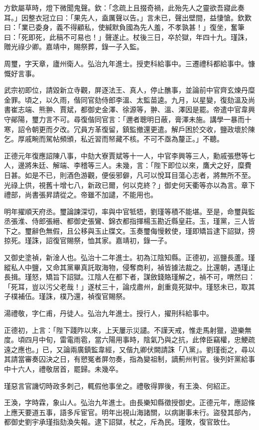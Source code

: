 \begin{pinyinscope}
方欽屬草時，燈下微聞鬼聲。欽：「念疏上且掇奇禍，此殆先人之靈欲吾寢此奏耳。」因整衣冠立曰：「果先人，盍厲聲以告。」言未已，聲出壁間，益悽愴。欽歎曰：「業已委身，義不得顧私，使緘默負國為先人羞，不孝孰甚！」復坐，奮筆曰：「死即死，此稿不可易也！」聲遂止。杖後三日，卒於獄，年四十九。瑾誅，贈光祿少卿。嘉靖中，賜祭葬，錄一子入監。

周璽，字天章，廬州衛人。弘治九年進士。授吏科給事中。三遷禮科都給事中。慷慨好言事。

武宗初即位，請毀新立寺觀，屏逐法王、真人，停止醮事，並論前中官齊玄煉丹糜金罪。頃之，以久雨，偕同官劾侍郎李溫、太監苗逵。九月，以星變，復劾溫及尚書崔志端、熊翀、賈斌，都御史金澤、徐源等，翀、溫、澤因是罷。帝遣中官韋興守鄖陽，璽力言不可。尋復偕同官言：「邇者聰明日蔽，膏澤未施。講學一暴而十寒，詔令朝更而夕改。冗員方革復留，鎮監撤還更遣。解戶困於交收，鹽政壞於陳乞。厚戚畹而駕帖頻頒，私近習而帑藏不核。不可不亟為釐正。」不聽。

正德元年復應詔陳八事，中劾大寮賈斌等十一人，中官李興等三人，勳戚張懋等七人，邊將朱廷、解端、李稽等三人。未幾，言：「陛下即位以來，鷹犬之好，糜費日甚。如是不已，則酒色游觀，便佞邪僻，凡可以悅耳目蕩心志者，將無所不至。光祿上供，視舊十增七八，新政已爾，何以克終？」御史何天衢等亦以為言。章下禮部，尚書張昇請從之。帝雖不加譴，不能用也。

明年擢順天府丞。璽論諫深切，率與中官牴牾，劉瑾等積不能堪。至是，命璽與監丞張淮、侍郎張縉、都御史張鸞、錦衣都指揮楊玉勘近縣皇莊。玉，瑾黨，三人皆下之。璽辭色無假，且公移與玉止牒文。玉奏璽侮慢敕使，瑾即矯旨逮下詔獄，搒掠死。瑾誅，詔復官賜祭，恤其家。嘉靖初，錄一子。

又御史塗禎，新淦人也。弘治十二年進士。初為江陰知縣。正德初，巡鹽長蘆。瑾縱私人中鹽，又命其黨畢真託取海物，侵奪商利，禎皆據法裁之。比還朝，遇瑾止長揖。瑾怒，矯旨下詔獄。江陰人在都下者，謀斂錢賂瑾解之，禎不可，喟然曰：「死耳，豈以污父老哉！」遂杖三十，論戍肅州，創重竟死獄中。瑾怒未已，取其子樸補伍。瑾誅，樸乃還，禎復官賜祭。

湯禮敬，字仁甫，丹徒人。弘治九年進士。授行人，擢刑科給事中。

正德初，上言：「陛下踐阼以來，上天屢示災譴。不謹天戒，惟走馬射獵，遊樂無度。頃四月中旬，雷電雨雹，當六陽用事時，陰氣乃與之抗，此倖臣竊權，忠鯁疏遠之應也。」已，又論兩廣鎮監韋經，又偕九卿伏闕請誅「八黨」。劉瑾銜之，尋以其請當審奏囚決之日，有愬冤者屏勿奏，指為變祖制，謫薊州判官。後列奸黨給事中十六人，禮敬居首，罷歸。未幾卒。

瑾惡言官譏切時政多刺己，輒假他事坐之。禮敬得罪後，有王渙、何紹正。

王渙，字時霖，象山人。弘治九年進士。由長樂知縣徵授御史。正德元年，應詔條上應天要道五事，語多斥宦官。明年出視山海諸關，以病謝事未行。盜發其部內，都御史劉宇承瑾指劾渙失報。逮下詔獄，杖之，斥為民。瑾敗，復官致仕。


\end{pinyinscope}
